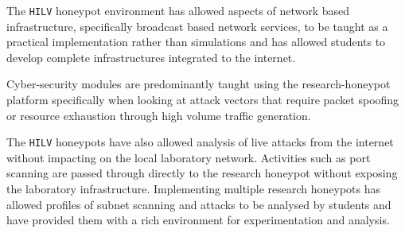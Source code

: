 The \texttt{HILV} honeypot environment has allowed aspects of network based infrastructure, specifically broadcast based network services, to be taught as a practical implementation rather than simulations and has allowed students to develop complete infrastructures integrated to the internet.

Cyber-security modules are predominantly taught using the research-honeypot platform specifically when looking at attack vectors that require packet spoofing or resource exhaustion through high volume traffic generation.

The \texttt{HILV} honeypots have also allowed analysis of live attacks from the internet without impacting on the local laboratory network. Activities such as port scanning are passed through directly to the research honeypot without exposing the laboratory infrastructure. Implementing multiple research honeypots has allowed profiles of subnet scanning and attacks to be analysed by students and have provided them with a rich environment for experimentation and analysis.    

